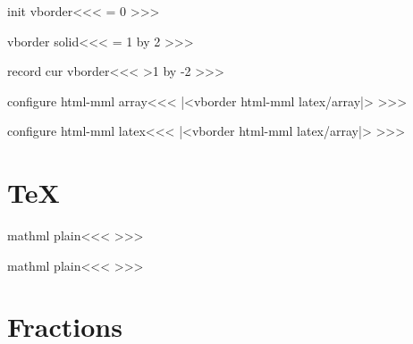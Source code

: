 {{{{{{\<init vborder\><<<
\HAssign\borderlines = 0
\global\let\columnlines=\relax
>>>

\<vborder solid\><<<
\ifx \columnlines\relax \gHAssign\borderlines = 1
                      \else \gHAdvance\borderlines by 2 \fi
>>>


\<record cur vborder\><<<
\ifnum \borderlines>1 \gHAdvance\borderlines by -2 \fi
\ifx \columnlines\relax 
    \global\let\columnlines\empty
\else
    \ifnum {} 
       \xdef\columnlines{\columnlines\ifx\columnlines\empty
                                     \else \space\fi solid}%
    \else
       \xdef\columnlines{\columnlines\ifx\columnlines\empty
                                     \else \space\fi none}%
    \fi
\fi
>>>

\<configure html-mml array\><<<
|<vborder html-mml latex/array|>
>>>

\<configure html-mml latex\><<<
|<vborder html-mml latex/array|>
>>>





\section{TeX}


\<mathml plain\><<<
   {}
   {}
   {}
   {}
   {}
   {}
\def\:eqalignno:{\Configure{noalign}
  {\HCode{<\a:mathml mtr><\a:mathml mtd \mml:class="noalign" colspan="2">}}%
  {\HCode{</\a:mathml mtd></\a:mathml mtr>}}}
>>>


\<mathml plain\><<<
   {}
   {}
   {}
   {}
   {}
   {}
\def\:leqalignno:{\Configure{noalign}
  {\HCode{<\a:mathml mtr><\a:mathml mtd \mml:class="noalign" colspan="2">}}%
  {\HCode{</\a:mathml mtd></\a:mathml mtr>}}}
>>>

\section{Fractions}


}}}}}}
